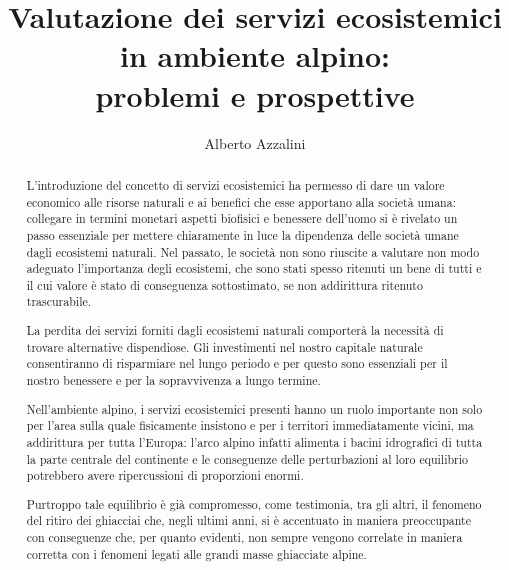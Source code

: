 \documentclass[14pt,a4paper]{article}
\author{Alberto Azzalini}
\title{Valutazione dei servizi ecosistemici in ambiente alpino:\\ problemi e prospettive}
\begin{document}
	\maketitle
	\tableofcontents
	\begin{abstract}
		L'introduzione del concetto di servizi ecosistemici ha permesso di dare un valore economico alle risorse naturali e ai benefici che esse apportano alla società umana: collegare in termini monetari aspetti biofisici e benessere dell'uomo si è rivelato un passo essenziale per mettere chiaramente in luce la dipendenza delle società umane dagli ecosistemi naturali.
		Nel passato, le società non sono riuscite a valutare non modo adeguato l'importanza degli ecosistemi, che sono stati spesso ritenuti un bene di tutti e il cui valore è stato di conseguenza sottostimato, se non addirittura ritenuto trascurabile.
		
		La perdita dei servizi forniti dagli ecosistemi naturali comporterà la necessità di trovare alternative dispendiose. Gli investimenti nel nostro capitale naturale consentiranno di risparmiare nel lungo periodo e per questo sono essenziali per il nostro benessere e per la sopravvivenza a lungo termine.
		
		Nell'ambiente alpino, i servizi ecosistemici presenti hanno un ruolo importante non solo per l'area sulla quale fisicamente insistono e per i territori immediatamente vicini, ma addirittura per tutta l'Europa: l'arco alpino infatti alimenta i bacini idrografici di tutta la parte centrale del continente e le conseguenze delle perturbazioni al loro equilibrio potrebbero avere ripercussioni di proporzioni enormi.
		
		Purtroppo tale equilibrio è già compromesso, come testimonia, tra gli altri, il fenomeno del ritiro dei ghiacciai che, negli ultimi anni, si è accentuato in maniera preoccupante con conseguenze che, per quanto evidenti, non sempre vengono correlate in maniera corretta con i fenomeni legati alle grandi masse ghiacciate alpine.
		
		
	\end{abstract}
	
\end{document}

